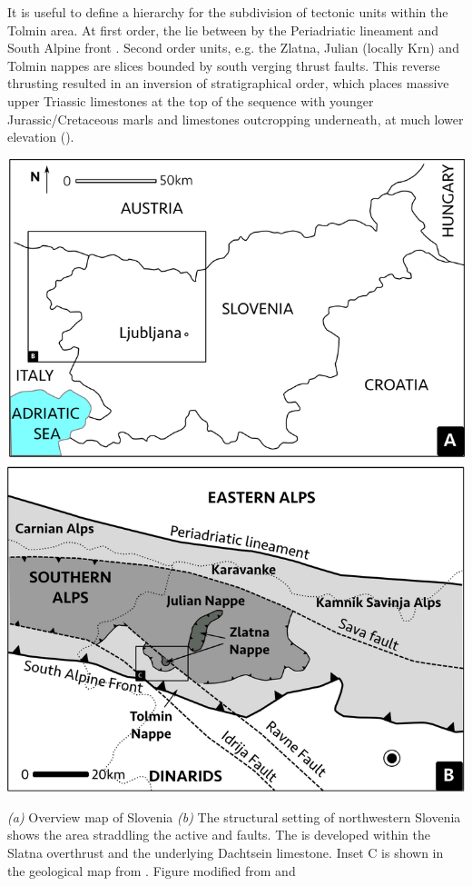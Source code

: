 It is useful to define a hierarchy for the subdivision of tectonic units within the Tolmin area. 
At first order, the  lie between by the Periadriatic lineament and South Alpine front \citep{placer1998contribution}. 
Second order units, e.g. the Zlatna, Julian (locally Krn) and Tolmin nappes are slices bounded by south verging thrust faults. 
This reverse thrusting resulted in an inversion of stratigraphical order, which places massive upper Triassic limestones at the top of the sequence with younger Jurassic/Cretaceous marls and limestones outcropping underneath, at much lower elevation ().

\begin{map}[b!]
\checkoddpage \ifoddpage \forcerectofloat \else \forceversofloat \fi
\includegraphics[width = \textwidth]{images/maps-of-mig/geology_large.png}
\caption[Structural setting of NW Slovenia]{\emph{(a)} Overview map of Slovenia \emph{(b)} The structural setting of northwestern Slovenia shows the \protect{} area straddling the active \protect{} and \protect{} faults. The \protect{} is developed within the Slatna overthrust and the underlying Dachtsein limestone. Inset C is shown in the geological map from \citet{buser1986tolmavc}. Figure modified from \citet{vsmuc2009tectonic} and \citet{celarc2014new}}
\label{map:geol large scale}
\end{map}


